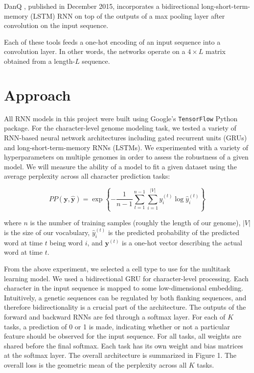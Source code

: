 \documentclass{article} %
\begin{document}
DanQ \cite{quang2015danq}, published in December 2015, incorporates a bidirectional long-short-term-memory (LSTM) RNN on top of the outputs of a max pooling layer after convolution on the input sequence.

Each of these tools feeds a one-hot encoding of an input sequence into a convolution layer. In other words, the networks operate on a $4\times L$ matrix obtained from a length-$L$ sequence. 

\section{Approach}

All RNN models in this project were built using Google's \texttt{TensorFlow} Python package. For the character-level genome modeling task, we tested a variety of RNN-based neural network architectures including gated recurrent units (GRUs) and long-short-term-memory RNNs (LSTMs). We experimented with a variety of hyperparameters on multiple genomes in order to assess the robustness of a given model. We will measure the ability of a model to fit a given dataset using the average perplexity across all character prediction tasks:

$$
	PP(\mathbf{y},\mathbf{\hat{y}}) = \exp \left\{-\frac{1}{n-1} \sum_{t=1}^{n-1} \sum_{i=1}^{|V|} y_i^{(t)} \log \hat{y}_i^{(t)}\right\}
$$

where $n$ is the number of training samples (roughly the length of our genome), $|V|$ is the size of our vocabulary, $\hat{y}^{(t)}_i$ is the predicted probability of the predicted word at time $t$ being word $i$, and $\mathbf{y}^{(t)}$ is a one-hot vector describing the actual word at time $t$.

From the above experiment, we selected a cell type to use for the multitask learning model. We used a bidirectional GRU for character-level processing. Each character in the input sequence is mapped to some low-dimensional embedding. Intuitively, a genetic sequences can be regulated by both flanking sequences, and therefore bidirectionality is a crucial part of the architecture. The outputs of the forward and backward RNNs are fed through a softmax layer. For each of $K$ tasks, a prediction of 0 or 1 is made, indicating whether or not a particular feature should be observed for the input sequence. For all tasks, all weights are shared before the final softmax. Each task has its own weight and bias matrices at the softmax layer. The overall architecture is summarized in Figure 1. The overall loss is the geometric mean of the perplexity across all $K$ tasks. 
\end{document}
